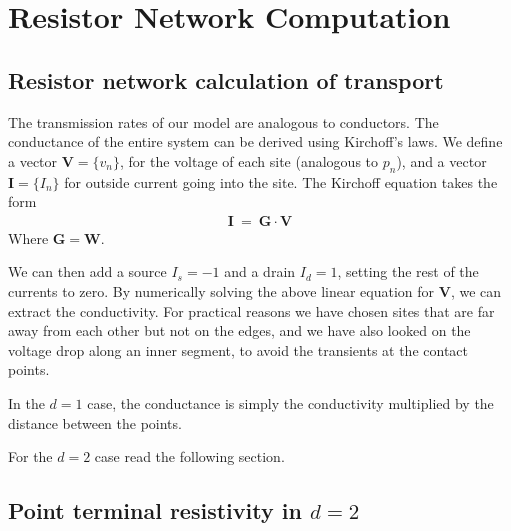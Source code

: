 %
%
%
%


\chapter{Resistor Network Computation}\label{sec:resnet}

\section{Resistor network calculation of transport}

The transmission rates of our model are analogous to
conductors. The conductance of the entire system can be derived
using Kirchoff's laws. 
We define a vector $\bm{V} = \{v_n\}$, for the voltage 
of each site (analogous to $p_n$), and a vector
$\bm{I} = \{I_n\}$ for outside current going into the site.
The Kirchoff equation takes the form
%
\begin{align}
\bm{I}\ =\ \bm{G}\cdot \bm{V}
\end{align}
%
Where $\bm{G} = \bm{W}$.


We can then add a source $I_s=-1$ and a drain $I_d=1$, setting the rest
of the currents to zero. By numerically solving the above linear equation for $\bm{V}$,
we can extract the conductivity. For practical reasons we have chosen
sites that are far away from each other but not on the edges,
and we have also looked on the voltage drop along an inner segment, to
avoid the transients at the contact points. 


In the $d{=}1$ case, the conductance is simply the conductivity multiplied
by the distance between the points.


For the $d{=}2$ case read the following section.

\section{Point terminal resistivity in $d{=}2$}

